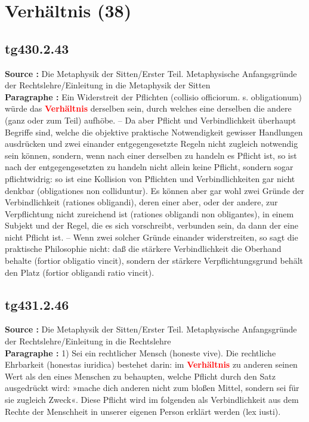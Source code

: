 \documentclass[a4paper,12pt,twoside]{book}
\newcommand{\match}[1]{\textcolor{red}{\textbf{#1}}}
\newcommand{\unnumberedsection}[1]{
	\section*{#1}
	\addcontentsline{toc}{section}{#1}
	\markright{#1}
}
\begin{document}
	\unnumberedsection{Verhältnis (38)} 
	\subsection*{tg430.2.43} 
	\textbf{Source : }Die Metaphysik der Sitten/Erster Teil. Metaphysische Anfangsgründe der Rechtslehre/Einleitung in die Metaphysik der Sitten\\  
	
	\textbf{Paragraphe : }Ein Widerstreit der Pflichten (collisio officiorum. s. obligationum) würde das \match{Verhältnis} derselben sein, durch welches eine derselben die andere (ganz oder zum Teil) aufhöbe. – Da aber Pflicht und Verbindlichkeit überhaupt Begriffe sind, welche die objektive praktische Notwendigkeit gewisser Handlungen ausdrücken und zwei einander entgegengesetzte Regeln nicht zugleich notwendig sein können, sondern, wenn nach einer derselben zu handeln es Pflicht ist, so ist nach der entgegengesetzten zu handeln nicht allein keine Pflicht, sondern sogar pflichtwidrig: so ist eine Kollision von Pflichten und Verbindlichkeiten gar nicht denkbar (obligationes non colliduntur). Es können aber gar wohl zwei Gründe der Verbindlichkeit (rationes obligandi), deren einer aber, oder der andere, zur Verpflichtung nicht zureichend ist (rationes obligandi non obligantes), in einem Subjekt und der Regel, die es sich vorschreibt, verbunden sein, da dann der eine nicht Pflicht ist. – Wenn zwei solcher Gründe einander widerstreiten, so sagt die praktische Philosophie nicht: daß die stärkere Verbindlichkeit die Oberhand behalte (fortior obligatio vincit), sondern  der stärkere Verpflichtungsgrund behält den Platz (fortior obligandi ratio vincit). 
	
	\subsection*{tg431.2.46} 
	\textbf{Source : }Die Metaphysik der Sitten/Erster Teil. Metaphysische Anfangsgründe der Rechtslehre/Einleitung in die Rechtslehre\\  
	
	\textbf{Paragraphe : }1) Sei ein rechtlicher Mensch (honeste vive). Die rechtliche Ehrbarkeit (honestas iuridica) bestehet darin: im \match{Verhältnis} zu anderen seinen Wert als den eines Menschen zu behaupten, welche Pflicht durch den Satz ausgedrückt wird: »mache dich anderen nicht zum bloßen Mittel, sondern sei für sie zugleich Zweck«. Diese Pflicht wird im folgenden als Verbindlichkeit aus dem Rechte der Menschheit in unserer eigenen Person erklärt werden (lex iusti). 
	
\end{document}
